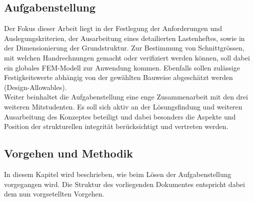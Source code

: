 \subsection{Aufgabenstellung}
\label{Aufgabenstellung}
Der Fokus dieser Arbeit liegt in der Festlegung der Anforderungen und Auslegungskriterien, der Ausarbeitung eines detailierten Lastenheftes, sowie in der Dimensionierung der Grundstruktur. Zur Bestimmung von Schnittgrössen, mit welchen Handrechnungen gemacht oder verifiziert werden können, soll dabei ein globales FEM-Modell zur Anwendung kommen. Ebenfalls sollen zulässige Festigkeitswerte abhängig von der gewählten Bauweise abgeschätzt werden (Design-Allowables).\\
Weiter beinhaltet die Aufgabenstellung eine enge Zusammenarbeit mit den drei weiteren Mitstudenten. Es soll sich aktiv an der Lösungsfindung und weiteren Ausarbeitung des Konzeptes beteiligt und dabei besonders die Aspekte und Position der strukturellen integrität berücksichtigt und vertreten werden.

\subsection{Vorgehen und Methodik}
In diesem Kapitel wird beschrieben, wie beim Lösen der Aufgabenstellung vorgegangen wird. Die Struktur des vorliegenden Dokumentes entspricht dabei dem nun vorgsetellten Vorgehen.

